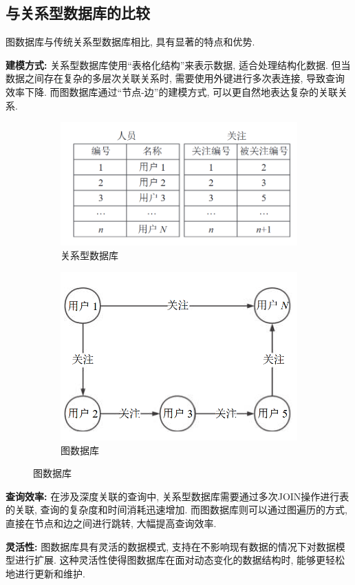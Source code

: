 \subsection{与关系型数据库的比较}

图数据库与传统关系型数据库相比, 具有显著的特点和优势.

\textbf{建模方式:} 关系型数据库使用“表格化结构”来表示数据, 适合处理结构化数据. 但当数据之间存在复杂的多层次关联关系时, 需要使用外键进行多次表连接, 导致查询效率下降. 而图数据库通过“节点-边”的建模方式, 可以更自然地表达复杂的关联关系.
\begin{figure}[H]
	\centering
	\begin{subfigure}[b]{0.45\textwidth}
		\centering
		\includegraphics[width=\textwidth]{images/1.png}
		\caption{关系型数据库}
	\end{subfigure}
	\hfill
	\begin{subfigure}[b]{0.45\textwidth}
		\centering
		\includegraphics[width=\textwidth]{images/2.png}
		\caption{图数据库}
	\end{subfigure}
\end{figure}


\textbf{查询效率:} 在涉及深度关联的查询中, 关系型数据库需要通过多次JOIN操作进行表的关联, 查询的复杂度和时间消耗迅速增加. 而图数据库则可以通过图遍历的方式, 直接在节点和边之间进行跳转, 大幅提高查询效率.

\textbf{灵活性:} 图数据库具有灵活的数据模式, 支持在不影响现有数据的情况下对数据模型进行扩展. 这种灵活性使得图数据库在面对动态变化的数据结构时, 能够更轻松地进行更新和维护.
